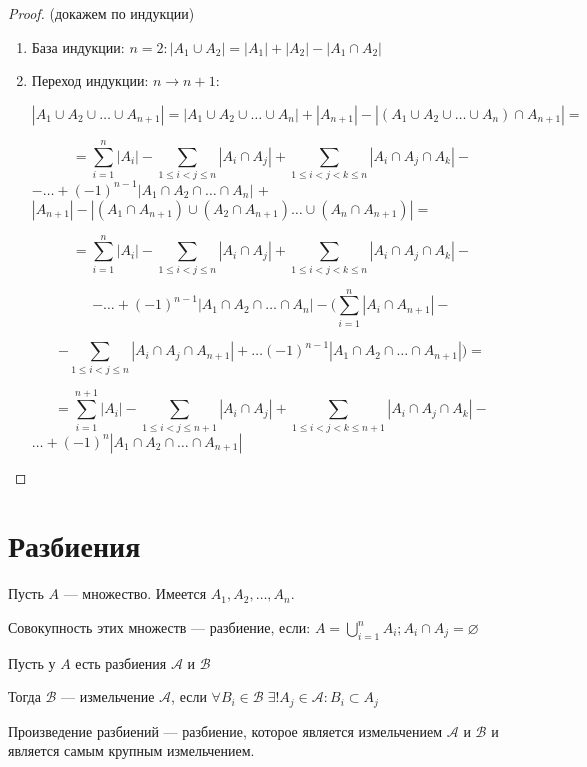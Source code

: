 \begin{proof} (докажем по индукции)
    \begin{enumerate}
        \item База индукции: $n = 2: |A_1 \cup A_2| = |A_1| + |A_2| - |A_1 \cap A_2|$
        \item Переход индукции: $n \to n + 1:$
        
        $|A_1 \cup A_2 \cup \ldots \cup A_{n+1}| = |A_1 \cup A_2 \cup \ldots \cup A_n| + |A_{n+1}| - |(A_1 \cup A_2 \cup \ldots \cup A_n) \cap A_{n+1}| = $

        $$= \sum_{i=1}^{n} |A_i| -\sum_{1 \leq i < j \leq n} |A_i \cap A_j| + \sum_{1 \leq i < j < k \leq n} |A_i \cap A_j \cap A_k| -$$ 
        $-\ldots + (-1)^{n-1} |A_1 \cap A_2 \cap \ldots \cap A_n|$ + $|A_{n+1}| - |(A_1 \cap A_{n+1}) \cup (A_2 \cap A_{n+1}) \ldots \cup (A_n \cap A_{n+1})| = $

        $$= \sum_{i=1}^{n} |A_i| -\sum_{1 \leq i < j \leq n} |A_i \cap A_j| + \sum_{1 \leq i < j < k \leq n} |A_i \cap A_j \cap A_k| -$$
        
        $$- \ldots + (-1)^{n-1} |A_1 \cap A_2 \cap \ldots \cap A_n| - (\sum_{i=1}^{n}|A_i \cap A_{n+1}| -$$
        
        $$- \sum_{1 \leq i < j \leq n}|A_i \cap A_j \cap A_{n+1}| + \ldots (-1)^{n-1}|A_1 \cap A_2 \cap \ldots \cap A_{n+1}|) = $$

        $$= \sum_{i=1}^{n+1} |A_i| -\sum_{1 \leq i < j \leq n+1} |A_i \cap A_j| + \sum_{1 \leq i < j < k \leq n+1} |A_i \cap A_j \cap A_k| - $$
        $\ldots + (-1)^{n} |A_1 \cap A_2 \cap \ldots \cap A_{n+1}|$
    \end{enumerate}
\end{proof}

\section{Разбиения}

\begin{definition}
    Пусть $A$ --- множество. Имеется $A_1, A_2, \ldots, A_n$. 
    
    Совокупность этих множеств --- разбиение, если: $A = \bigcup_{i=1}^{n} A_i; A_i \cap A_j = \varnothing$
\end{definition}

\begin{definition}
    Пусть у $A$ есть разбиения $\mathcal{A}$ и $\mathcal{B}$
    
    Тогда $\mathcal{B}$ --- измельчение $\mathcal{A}$, если $\forall B_i \in \mathcal{B} \; \exists! A_j \in \mathcal{A}: B_i \subset A_j$
\end{definition}

\begin{definition}
    Произведение разбиений --- разбиение, которое является измельчением $\mathcal{A}$ и $\mathcal{B}$ и является самым крупным измельчением.
\end{definition}